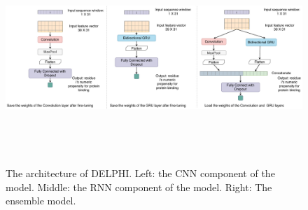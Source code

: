 \begin{figure}
\centering
\includegraphics[height=8cm]{img/Model_architecture.pdf}
\caption[The architecture of DELPHI]{The architecture of DELPHI. Left: the CNN component of the model. Middle: the RNN component of the model. Right: The ensemble model. 
  \label{fig_architecture}}
\end{figure}
